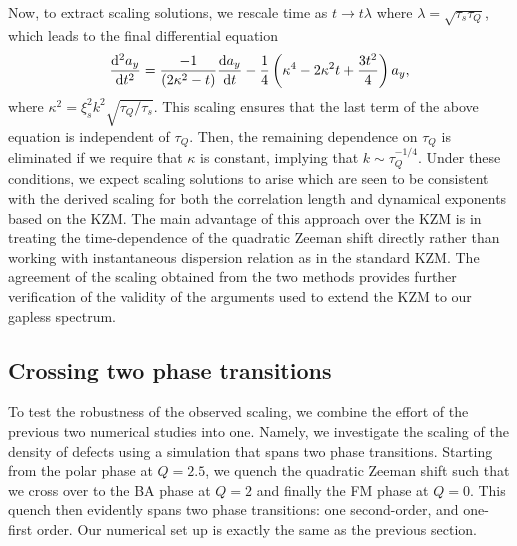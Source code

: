 Now, to extract scaling solutions, we rescale time as \(t\rightarrow t\lambda \)
where \(\lambda = \sqrt{\tau_s\tau_Q}\), which leads to the final differential
equation
\begin{align} \label{eq: eqn-scaled-lin}
    \dv[2]{a_y}{t} = \frac{-1}{\left( 2\kappa^2 - t\right)}\dv{a_y}{t}
    -\frac{1}{4} \left( \kappa^4 - 2\kappa^2 t + \frac{3 t^2}{4} \right)a_y,
\end{align}
where \(\kappa^2 = \xi_s^2 k^2 \sqrt{\tau_Q/\tau_s}\).
This scaling ensures that the last term of the above equation is independent of
\(\tau_Q\).
Then, the remaining dependence on \(\tau_Q\) is eliminated if we require that
\(\kappa \) is constant, implying that \(k \sim \tau_Q^{-1/4}\).
Under these conditions, we expect scaling solutions to arise which are seen to
be consistent with the derived scaling for both the correlation length and
dynamical exponents based on the KZM\@.
The main advantage of this approach over the KZM is in treating the
time-dependence of the quadratic Zeeman shift directly rather than working with
instantaneous dispersion relation as in the standard KZM\@.
The agreement of the scaling obtained from the two methods provides further
verification of the validity of the arguments used to extend the KZM to our
gapless spectrum.

\subsection{Crossing two phase transitions}
To test the robustness of the observed scaling, we combine the effort of the
previous two numerical studies into one.
Namely, we investigate the scaling of the density of defects using a simulation
that spans two phase transitions.
Starting from the polar phase at \(Q  = 2.5\), we quench the quadratic Zeeman
shift such that we cross over to the BA phase at \(Q=2\) and finally the FM
phase at \(Q=0\).
This quench then evidently spans two phase transitions: one second-order, and
one-first order.
Our numerical set up is exactly the same as the previous section.

